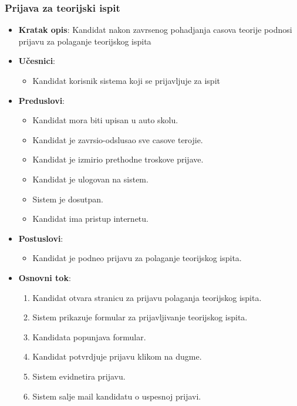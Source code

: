 \subsubsection{Prijava za teorijski ispit}
\label{subsubsec:prijava za ispit}
\begin{itemize}
  \item \textbf{Kratak opis}: Kandidat nakon zavrsenog pohadjanja casova teorije podnosi prijavu za polaganje teorijskog ispita
  \item \textbf{Učesnici}:
    \begin{itemize}
    \item Kandidat korisnik sistema koji se prijavljuje za ispit
    \end{itemize}
  \item \textbf{Preduslovi}:
    \begin{itemize}
    \item  Kandidat mora biti upisan u auto skolu.
    \item  Kandidat je zavrsio-odslusao sve casove terojie.
    \item  Kandidat je izmirio prethodne troskove prijave.
    \item  Kandidat je ulogovan na sistem.
    \item  Sistem je dosutpan.
    \item  Kandidat ima pristup internetu.
    \end{itemize}
  \item \textbf{Postuslovi}:
      \begin{itemize}
      \item Kandidat je podneo prijavu za polaganje teorijskog ispita.
      \end{itemize}
  \item \textbf{Osnovni tok}:
      \begin{enumerate}
        \item Kandidat otvara stranicu za prijavu polaganja teorijskog ispita.
        \item Sistem prikazuje formular za prijavljivanje teorijskog ispita.
        \item Kandidata popunjava formular.
        \item Kandidat potvrdjuje prijavu klikom na dugme.
        \item Sistem evidnetira prijavu.
        \item Sistem salje mail kandidatu o uspesnoj prijavi.  
      \end{enumerate}


\end{itemize}
